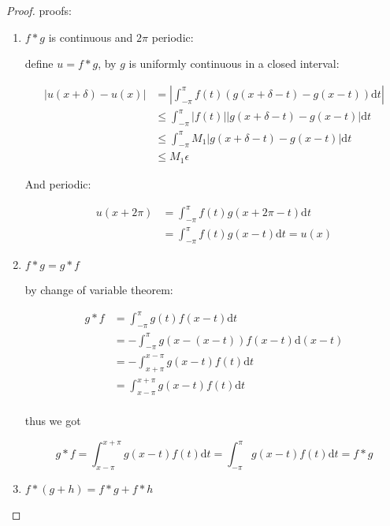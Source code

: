\begin{proof}
    proofs:

    \begin{enumerate}
        \item $f \ast g$ is continuous and $2\pi$ periodic:
        
        define $u = f\ast g$, by $g$ is uniformly continuous in a closed interval:

        \begin{align*}
            \left| u(x + \delta) - u(x) \right|&= \left|\int_{-\pi}^{\pi} f(t)\left(g(x+ \delta  - t) - g(x-t)\right)\mathrm{d}t \right|\\
            & \le  \int_{-\pi}^{\pi} \left| f(t) \right| \left|g(x+ \delta  - t) - g(x-t) \right|\mathrm{d} t  \\
            & \le \int_{-\pi}^{\pi} M_1 \left|g(x+ \delta  - t) - g(x-t) \right|\mathrm{d} t \\
            &\le M_1 \epsilon
        \end{align*}

        And periodic:

        \begin{align*}
            u(x + 2\pi) &= \int_{-\pi}^{\pi} f(t)g(x+ 2\pi  - t) \mathrm{d}t  \\
            &= \int_{-\pi}^{\pi} f(t)g(x  - t) \mathrm{d}t = u(x)
        \end{align*}

        \item $f \ast g = g \ast f$

        by change of variable theorem:

        \begin{align*}
         g \ast f &= \int_{-\pi}^{\pi} g(t)f(x - t) \mathrm{d}t    \\
         &= -\int_{-\pi}^{\pi} g(x-(x-t))f(x - t) \mathrm{d}(x-t) \\
         &= -\int_{x+\pi}^{x-\pi} g(x-t)f(t) \mathrm{d}t \\
         &= \int_{x-\pi}^{x+\pi} g(x-t)f(t) \mathrm{d}t \\
        \end{align*}

        thus we got

        \[
 g \ast f =\int_{x-\pi}^{x+\pi} g(x-t)f(t) \mathrm{d}t = \int_{-\pi}^{\pi} g(x-t)f(t) \mathrm{d}t = f \ast g
        \]

        \item $f \ast (g+h) = f \ast g + f \ast h$


\end{enumerate}
\end{proof}
